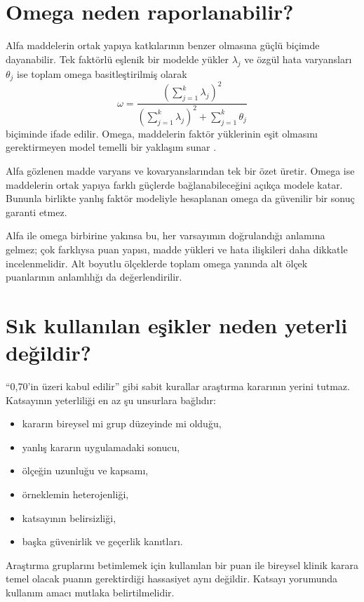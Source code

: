 \section{Omega neden raporlanabilir?}

Alfa maddelerin ortak yapıya katkılarının benzer olmasına güçlü biçimde
dayanabilir. Tek faktörlü eşlenik bir modelde yükler $\lambda_j$ ve özgül hata
varyansları $\theta_j$ ise toplam omega basitleştirilmiş olarak
\[
\omega=\frac{\left(\sum_{j=1}^{k}\lambda_j\right)^2}
{\left(\sum_{j=1}^{k}\lambda_j\right)^2+\sum_{j=1}^{k}\theta_j}
\]
biçiminde ifade edilir. Omega, maddelerin faktör yüklerinin eşit olmasını
gerektirmeyen model temelli bir yaklaşım sunar \citep{dunn2014,mcneish2018}.

\begin{sezgibox}
Alfa gözlenen madde varyans ve kovaryanslarından tek bir özet üretir. Omega
ise maddelerin ortak yapıya farklı güçlerde bağlanabileceğini açıkça modele
katar. Bununla birlikte yanlış faktör modeliyle hesaplanan omega da güvenilir
bir sonuç garanti etmez.
\end{sezgibox}

Alfa ile omega birbirine yakınsa bu, her varsayımın doğrulandığı anlamına
gelmez; çok farklıysa puan yapısı, madde yükleri ve hata ilişkileri daha
dikkatle incelenmelidir. Alt boyutlu ölçeklerde toplam omega yanında alt ölçek
puanlarının anlamlılığı da değerlendirilir.

\section{Sık kullanılan eşikler neden yeterli değildir?}

``0,70'in üzeri kabul edilir'' gibi sabit kurallar araştırma kararının yerini
tutmaz. Katsayının yeterliliği en az şu unsurlara bağlıdır:

\begin{itemize}
  \item kararın bireysel mi grup düzeyinde mi olduğu,
  \item yanlış kararın uygulamadaki sonucu,
  \item ölçeğin uzunluğu ve kapsamı,
  \item örneklemin heterojenliği,
  \item katsayının belirsizliği,
  \item başka güvenirlik ve geçerlik kanıtları.
\end{itemize}

Araştırma gruplarını betimlemek için kullanılan bir puan ile bireysel klinik
karara temel olacak puanın gerektirdiği hassasiyet aynı değildir. Katsayı
yorumunda kullanım amacı mutlaka belirtilmelidir.


